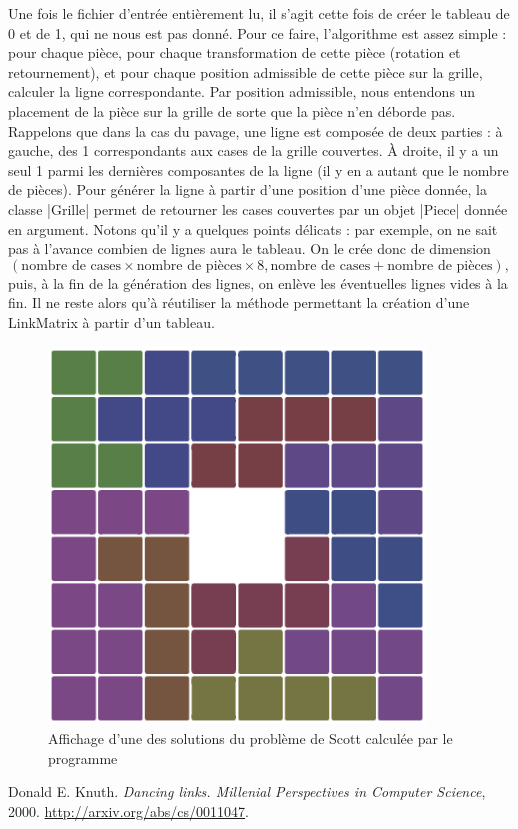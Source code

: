\documentclass[11pt,french,a4paper]{article}
\begin{document}
Une fois le fichier d'entrée entièrement lu, il s'agit cette fois de créer le tableau de 0 et de 1, qui ne nous est pas donné. Pour ce faire, l'algorithme est assez simple : pour chaque pièce, pour chaque transformation de cette pièce (rotation et retournement), et pour chaque position admissible de cette pièce sur la grille, calculer la ligne correspondante. Par position admissible, nous entendons un placement de la pièce sur la grille de sorte que la pièce n'en déborde pas. Rappelons que dans la cas du pavage, une ligne est composée de deux parties : à gauche, des 1 correspondants aux cases de la grille couvertes. À droite, il y a un seul 1 parmi les dernières composantes de la ligne (il y en a autant que le nombre de pièces). Pour générer la ligne à partir d'une position d'une pièce donnée, la classe |Grille| permet de retourner les cases couvertes par un objet |Piece| donnée en argument. Notons qu'il y a quelques points délicats : par exemple, on ne sait pas à l'avance combien de lignes aura le tableau. On le crée donc de dimension 
\[(\text{nombre de cases}\times\text{nombre de pièces}\times8 , \text{nombre de cases} + \text{nombre de pièces}),\]
puis, à la fin de la génération des lignes, on enlève les éventuelles lignes vides à la fin. Il ne reste alors qu'à réutiliser la méthode permettant la création d'une LinkMatrix à partir d'un tableau. 

\begin{figure}[h]
\centering
\includegraphics[height=10cm]{pavage}
\caption{Affichage d'une des solutions du problème de Scott calculée par le programme}
\end{figure}

\begin{thebibliography}{9}
 Donald E. Knuth. \emph{Dancing links. Millenial Perspectives in Computer Science}, 2000.
\url{http://arxiv.org/abs/cs/0011047}.
\end{thebibliography}
\end{document}
